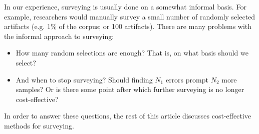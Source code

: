 \documentclass[10pt,conference]{IEEEtran}
\newcommand{\bi}{\begin{itemize}}
\newcommand{\ei}{\end{itemize}}
\begin{document}



 In our experience, surveying is  usually done on a somewhat informal basis.
 For example, researchers  would manually survey
a small number of randomly selected
 artifacts
  (e.g.  1\% of the corpus; or 100 artifacts). There are many problems with the informal
  approach to surveying:
  \bi
  \item How many
  random selections are enough?   That is, 
  on what basis should we select?
   \item
  And
   when to stop surveying?
  Should finding $N_1$ errors prompt $N_2$ more samples? Or is there some
  point after which further surveying is no longer cost-effective? 
  \ei
  In order to answer these questions,
the rest of this article discusses cost-effective methods for surveying. 
 
\end{document}
